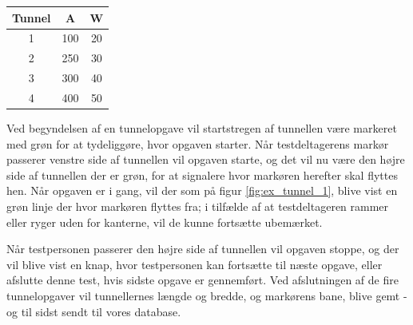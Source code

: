 \begin{center}
	\begin{tabular}{c c c}
		Tunnel & A & W \\
		\hline
		1 & 100 & 20 \\
		2 & 250 & 30 \\
		3 & 300 & 40 \\
		4 & 400 & 50 \\
	\end{tabular}
	\label{tab:tunnelopgave}
\end{center}
Ved begyndelsen af en tunnelopgave vil startstregen af tunnellen være markeret med grøn for at tydeliggøre, hvor opgaven starter. Når testdeltagerens markør passerer venstre side af tunnellen vil opgaven starte, og det vil nu være den højre side af tunnellen der er grøn, for at signalere hvor markøren herefter skal flyttes hen. Når opgaven er i gang, vil der som på figur \ref{fig:ex_tunnel_1}, blive vist en grøn linje der hvor markøren flyttes fra; i tilfælde af at testdeltageren rammer eller ryger uden for kanterne, vil de kunne fortsætte ubemærket.

Når testpersonen passerer den højre side af tunnellen vil opgaven stoppe, og der vil blive vist en knap, hvor testpersonen kan fortsætte til næste opgave, eller afslutte denne test, hvis sidste opgave er gennemført. Ved afslutningen af de fire tunnelopgaver vil tunnellernes længde og bredde, og markørens bane, blive gemt - og til sidst sendt til vores database.

